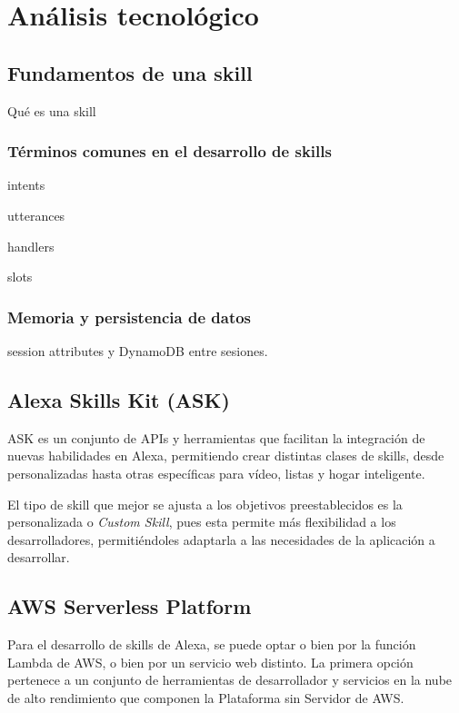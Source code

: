 \section{Análisis tecnológico}


\subsection{Fundamentos de una skill}

Qué es una skill

\subsubsection{Términos comunes en el desarrollo de skills}

intents

utterances

handlers 

slots

\subsubsection{Memoria y persistencia de datos}

session attributes y DynamoDB entre sesiones.

\subsection{Alexa Skills Kit (ASK)}

ASK es un conjunto de APIs y herramientas que facilitan la integración de nuevas habilidades en Alexa, permitiendo crear distintas clases de skills, desde personalizadas hasta otras específicas para vídeo, listas y hogar inteligente.

El tipo de skill que mejor se ajusta a los objetivos preestablecidos es la personalizada o \textit{Custom Skill}, pues esta permite más flexibilidad a los desarrolladores, permitiéndoles adaptarla a las necesidades de la aplicación a desarrollar.

\subsection{AWS Serverless Platform}

Para el desarrollo de skills de Alexa, se puede optar o bien por la función Lambda de AWS, o bien por un servicio web distinto. La primera opción pertenece a un conjunto de herramientas de desarrollador y servicios en la nube de alto rendimiento que componen la Plataforma sin Servidor de AWS.

